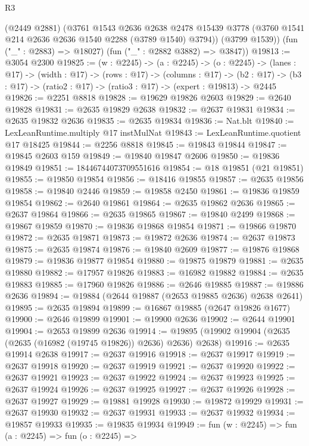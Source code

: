 \begin{lexlean}{R3}
\begin{coremodule}
        (@2449 @2881)
        (@3761
          @1543
          @2636
          @2638
          @2478
          @15439
          @3778
          (@3760 @1541 @214 @2636 @2636 @1540 @2288 (@3789 @1540) @3794))
        (@3799 @1539))
      (fun ("_" : @2883) => @18027)
      (fun ("_" : @2882 @3882) => @3847))
@19813 := @3054 @2300
@19825 := (w : @2245) ->
  (a : @2245) ->
  (o : @2245) ->
  (lanes : @17) ->
  (width : @17) ->
  (rows : @17) ->
  (columns : @17) ->
  (b2 : @17) -> (b3 : @17) -> (ratio2 : @17) -> (ratio3 : @17) -> (expert : @19813) -> @2445
@19826 := @2251 @8818
@19828 := @19629 @19826 @2603
@19829 := @2640 @19828
@19831 := @2635 @19829 @2638
@19832 := @2637 @19831
@19834 := @2635 @19832 @2636
@19835 := @2635 @19834
@19836 := Nat.blt
@19840 := LexLeanRuntime.multiply @17 instMulNat
@19843 := LexLeanRuntime.quotient @17 @18425
@19844 := @2256 @8818
@19845 := @19843 @19844
@19847 := @19845 @2603 @159
@19849 := @19840 @19847 @2606
@19850 := @19836 @19849
@19851 := 18446744073709551616
@19854 := @18 @19851 (@21 @19851)
@19855 := @19850 @19854
@19856 := @18416 @19855
@19857 := @2635 @19856
@19858 := @19840 @2446
@19859 := @19858 @2450
@19861 := @19836 @19859 @19854
@19862 := @2640 @19861
@19864 := @2635 @19862 @2636
@19865 := @2637 @19864
@19866 := @2635 @19865
@19867 := @19840 @2499
@19868 := @19867 @19859
@19870 := @19836 @19868 @19854
@19871 := @19866 @19870
@19872 := @2635 @19871
@19873 := @19872 @2636
@19874 := @2637 @19873
@19875 := @2635 @19874
@19876 := @19840 @2609
@19877 := @19876 @19868
@19879 := @19836 @19877 @19854
@19880 := @19875 @19879
@19881 := @2635 @19880
@19882 := @17957 @19826
@19883 := @16982 @19882
@19884 := @2635 @19883
@19885 := @17960 @19826
@19886 := @2646 @19885
@19887 := @19886 @2636
@19894 := @19884 (@2644 @19887 (@2653 @19885 @2636) @2638 @2641)
@19895 := @2635 @19894
@19899 := @16867 @19885 (@2647 @19826 @1677)
@19900 := @2646 @19899
@19901 := @19900 @2636
@19902 := @2644 @19901
@19904 := @2653 @19899 @2636
@19914 := @19895 (@19902 @19904 (@2635 (@2635 (@16982 (@19745 @19826)) @2636) @2636) @2638)
@19916 := @2635 @19914 @2638
@19917 := @2637 @19916
@19918 := @2637 @19917
@19919 := @2637 @19918
@19920 := @2637 @19919
@19921 := @2637 @19920
@19922 := @2637 @19921
@19923 := @2637 @19922
@19924 := @2637 @19923
@19925 := @2637 @19924
@19926 := @2637 @19925
@19927 := @2637 @19926
@19928 := @2637 @19927
@19929 := @19881 @19928
@19930 := @19872 @19929
@19931 := @2637 @19930
@19932 := @2637 @19931
@19933 := @2637 @19932
@19934 := @19857 @19933
@19935 := @19835 @19934
@19949 := fun (w : @2245) =>
  fun (a : @2245) =>
  fun (o : @2245) =>

\end{coremodule}
\end{lexlean}
